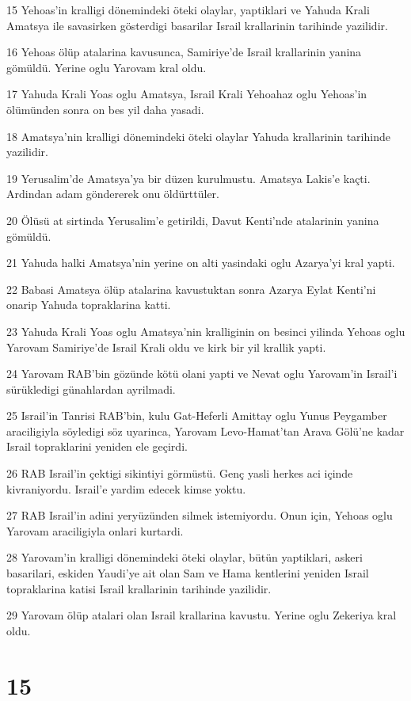 \par 15 Yehoas'in kralligi dönemindeki öteki olaylar, yaptiklari ve Yahuda Krali Amatsya ile savasirken gösterdigi basarilar Israil krallarinin tarihinde yazilidir.
\par 16 Yehoas ölüp atalarina kavusunca, Samiriye'de Israil krallarinin yanina gömüldü. Yerine oglu Yarovam kral oldu.
\par 17 Yahuda Krali Yoas oglu Amatsya, Israil Krali Yehoahaz oglu Yehoas'in ölümünden sonra on bes yil daha yasadi.
\par 18 Amatsya'nin kralligi dönemindeki öteki olaylar Yahuda krallarinin tarihinde yazilidir.
\par 19 Yerusalim'de Amatsya'ya bir düzen kurulmustu. Amatsya Lakis'e kaçti. Ardindan adam göndererek onu öldürttüler.
\par 20 Ölüsü at sirtinda Yerusalim'e getirildi, Davut Kenti'nde atalarinin yanina gömüldü.
\par 21 Yahuda halki Amatsya'nin yerine on alti yasindaki oglu Azarya'yi kral yapti.
\par 22 Babasi Amatsya ölüp atalarina kavustuktan sonra Azarya Eylat Kenti'ni onarip Yahuda topraklarina katti.
\par 23 Yahuda Krali Yoas oglu Amatsya'nin kralliginin on besinci yilinda Yehoas oglu Yarovam Samiriye'de Israil Krali oldu ve kirk bir yil krallik yapti.
\par 24 Yarovam RAB'bin gözünde kötü olani yapti ve Nevat oglu Yarovam'in Israil'i sürükledigi günahlardan ayrilmadi.
\par 25 Israil'in Tanrisi RAB'bin, kulu Gat-Heferli Amittay oglu Yunus Peygamber araciligiyla söyledigi söz uyarinca, Yarovam Levo-Hamat'tan Arava Gölü'ne kadar Israil topraklarini yeniden ele geçirdi.
\par 26 RAB Israil'in çektigi sikintiyi görmüstü. Genç yasli herkes aci içinde kivraniyordu. Israil'e yardim edecek kimse yoktu.
\par 27 RAB Israil'in adini yeryüzünden silmek istemiyordu. Onun için, Yehoas oglu Yarovam araciligiyla onlari kurtardi.
\par 28 Yarovam'in kralligi dönemindeki öteki olaylar, bütün yaptiklari, askeri basarilari, eskiden Yaudi'ye ait olan Sam ve Hama kentlerini yeniden Israil topraklarina katisi Israil krallarinin tarihinde yazilidir.
\par 29 Yarovam ölüp atalari olan Israil krallarina kavustu. Yerine oglu Zekeriya kral oldu.

\chapter{15}

